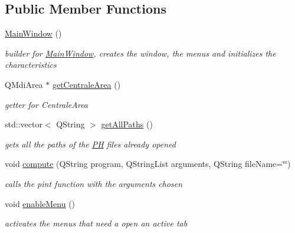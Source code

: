 \subsection*{\-Public \-Member \-Functions}
\begin{DoxyCompactItemize}
\item 
\hypertarget{class_main_window_a34c4b4207b46d11a4100c9b19f0e81bb}{\hyperlink{class_main_window_a34c4b4207b46d11a4100c9b19f0e81bb}{\-Main\-Window} ()}\label{class_main_window_a34c4b4207b46d11a4100c9b19f0e81bb}

\begin{DoxyCompactList}\small\item\em builder for \hyperlink{class_main_window}{\-Main\-Window}, creates the window, the menus and initializes the characteristics \end{DoxyCompactList}\item 
\-Q\-Mdi\-Area $\ast$ \hyperlink{class_main_window_a398296c146bb239d0b75a24b44132658}{get\-Centrale\-Area} ()
\begin{DoxyCompactList}\small\item\em getter for \-Centrale\-Area \end{DoxyCompactList}\item 
\hypertarget{class_main_window_a5cc52553f615cb3abeb1198ad8c018a3}{std\-::vector$<$ \-Q\-String $>$ \hyperlink{class_main_window_a5cc52553f615cb3abeb1198ad8c018a3}{get\-All\-Paths} ()}\label{class_main_window_a5cc52553f615cb3abeb1198ad8c018a3}

\begin{DoxyCompactList}\small\item\em gets all the paths of the \hyperlink{class_p_h}{\-P\-H} files already opened \end{DoxyCompactList}\item 
void \hyperlink{class_main_window_a8a30572d7170d0a51737cd4991f0a05f}{compute} (\-Q\-String program, \-Q\-String\-List arguments, \-Q\-String file\-Name=\char`\"{}\char`\"{})
\begin{DoxyCompactList}\small\item\em calls the pint function with the arguments chosen \end{DoxyCompactList}\item 
\hypertarget{class_main_window_ac4c3ec77ba5666ff9ef670b4b02c6838}{void \hyperlink{class_main_window_ac4c3ec77ba5666ff9ef670b4b02c6838}{enable\-Menu} ()}\label{class_main_window_ac4c3ec77ba5666ff9ef670b4b02c6838}

\begin{DoxyCompactList}\small\item\em activates the menus that need a open an active tab \end{DoxyCompactList}\end{DoxyCompactItemize}
